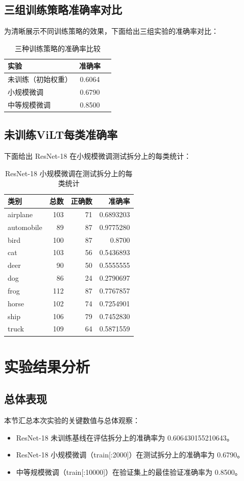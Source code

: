 \subsection{三组训练策略准确率对比}
为清晰展示不同训练策略的效果，下面给出三组实验的准确率对比：
\begin{table}[htbp]
\centering
\begin{tabular}{lcc}
\hline
实验 & 准确率 \\
\hline
未训练（初始权重） & 0.6064 \\
小规模微调 & 0.6790 \\
中等规模微调 & 0.8500 \\
\hline
\end{tabular}
\caption{三种训练策略的准确率比较}
\end{table}

\subsection{未训练ViLT每类准确率}
下面给出 ResNet-18 在小规模微调测试拆分上的每类统计：
\begin{table}[htbp]
\centering
\begin{tabular}{lrrr}
\hline
类别 & 总数 & 正确数 & 准确率 \\
\hline
airplane & 103 & 71 & 0.6893203 \\
automobile & 89 & 87 & 0.9775280 \\
bird & 100 & 87 & 0.8700 \\
cat & 103 & 56 & 0.5436893 \\
deer & 90 & 50 & 0.5555555 \\
dog & 86 & 24 & 0.2790697 \\
frog & 112 & 87 & 0.7767857 \\
horse & 102 & 74 & 0.7254901 \\
ship & 106 & 79 & 0.7452830 \\
truck & 109 & 64 & 0.5871559 \\
\hline
\end{tabular}
\caption{ResNet-18 小规模微调在测试拆分上的每类统计}
\end{table}

\section{实验结果分析}
\subsection{总体表现}
本节汇总本次实验的关键数值与总体观察：
\begin{itemize}
  \item ResNet-18 未训练基线在评估拆分上的准确率为 0.606430155210643。
  \item ResNet-18 小规模微调（train[:2000]）在测试拆分上的准确率为 0.6790。
  \item 中等规模微调（train[:10000]）在验证集上的最佳验证准确率为 0.8500。
\end{itemize}

